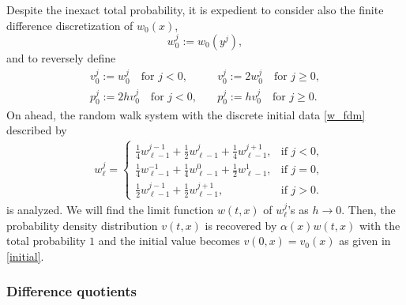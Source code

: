 \documentclass[11pt]{amsart}
\begin{document}
Despite the inexact total probability, it is expedient to consider also the finite difference discretization of $w_0(x)$,
\begin{equation}\label{w_fdm}
w^{j}_0:=w_0(y^j),
\end{equation}
and to reversely define  
\begin{align*}
 v^j_0:=w^j_0 \quad \text{for $j<0$}, \quad &v^j_0:=2w^j_0 \quad \text{for $j\ge0$},\\
 p^j_0:=2hv^j_0\quad \text{for $j<0$}, \quad &p^j_0:=hv^j_0 \quad \text{for $j\ge0$}.
\end{align*}
On ahead, the random walk system with the discrete initial data \eqref{w_fdm} described by 
\begin{equation} \label{RW3}\tag{RW3}
\begin{aligned}
    &w^{j}_\ell = \left\{\begin{array}{ll}
        \frac{1}{4}w^{j-1} _{\ell-1} + \frac{1}{2}w ^{j} _{\ell-1} +
        \frac{1}{4} w^{j+1}_{\ell-1}, & \text{if $j<0$},\\
        \frac{1}{4}w^{-1} _{\ell-1} + \frac{1}{4}w^{0} _{\ell-1} +
        \frac{1}{2}w ^{1} _{\ell-1}, & \text{if $j=0$},\\
        \frac{1}{2}w^{j-1} _{\ell-1} + \frac{1}{2}w ^{j+1} _{\ell-1}, &
        \text{if } j>0.
        \end{array}\right.
\end{aligned}
\end{equation}
is analyzed. We will find the limit function $w(t,x)$ of $w_\ell^j$'s as $h\to0$. Then, the probability density distribution $v(t,x)$ is recovered by $\alpha(x)w(t,x)$ with the total probability $1$ and the initial value becomes $v(0,x)=v_0(x)$ as given in \eqref{initial}.

\subsubsection{Difference quotients}
\end{document}
